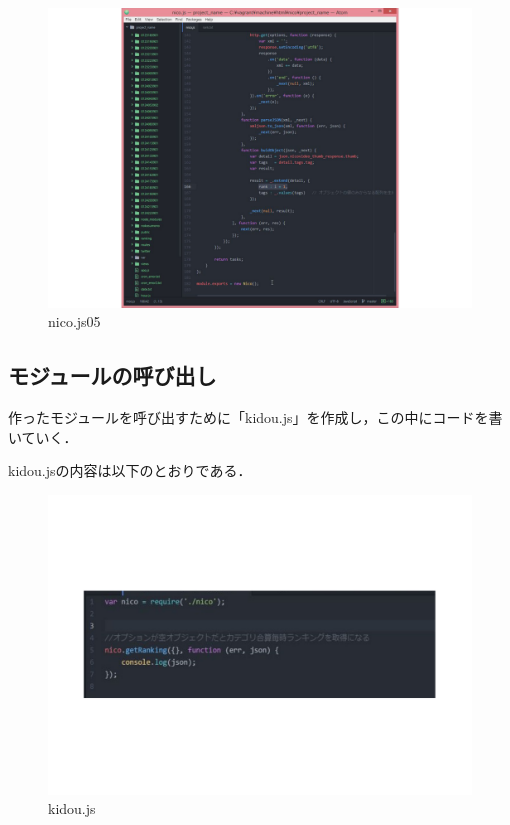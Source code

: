 	\begin{figure}[h]
		\centering
		\includegraphics[width=14cm]{nico05.pdf}
		\caption{nico.js05}\label{ace}
	\end{figure}

\clearpage

\subsection*{モジュールの呼び出し}
作ったモジュールを呼び出すために「kidou.js」を作成し，この中にコードを書いていく．

kidou.jsの内容は以下のとおりである．


	\begin{figure}[h]
		\centering
		\includegraphics[width=14cm]{kidou.pdf}
		\caption{kidou.js}\label{ace}
	\end{figure}

